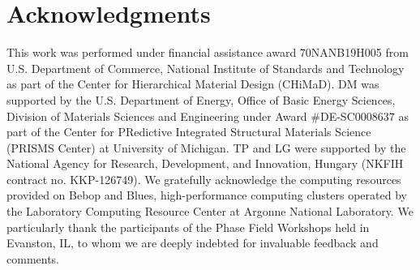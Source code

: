 \documentclass[preprint,12pt]{elsarticle}
\begin{document}
\section*{Acknowledgments}
This work was performed under financial assistance award 70NANB19H005 from U.S. Department of Commerce, National Institute of Standards and Technology as part of the Center for Hierarchical Material Design (CHiMaD). DM was supported by the U.S. Department of Energy, Office of Basic Energy Sciences, Division of Materials Sciences and Engineering under Award \#DE-SC0008637 as part of the Center for PRedictive Integrated Structural Materials Science (PRISMS Center) at University of Michigan. TP and LG were supported by the National Agency for Research, Development, and Innovation, Hungary (NKFIH contract no. KKP-126749). We gratefully acknowledge the computing resources provided on Bebop and Blues, high-performance computing clusters operated by the Laboratory Computing Resource Center at Argonne National Laboratory. We particularly thank the participants of the Phase Field Workshops held in Evanston, IL, to whom we are deeply indebted for invaluable feedback and comments.   



\end{document}
